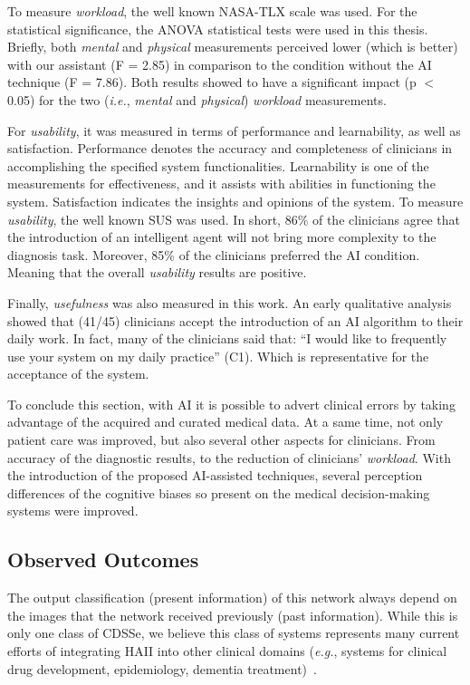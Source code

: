 To measure {\it workload}, the well known \ac{NASA-TLX} scale was used.
For the statistical significance, the \ac{ANOVA} statistical tests were used in this thesis.
Briefly, both {\it mental} and {\it physical} measurements perceived lower (which is better) with our assistant (F = 2.85) in comparison to the condition without the AI technique (F = 7.86).
Both results showed to have a significant impact (p $<$ 0.05) for the two ({\it i.e.}, {\it mental} and {\it physical}) {\it workload} measurements.

For {\it usability}, it was measured in terms of performance and learnability, as well as satisfaction.
Performance denotes the accuracy and completeness of clinicians in accomplishing the specified system functionalities.
Learnability is one of the measurements for effectiveness, and it assists with abilities in functioning the system.
Satisfaction indicates the insights and opinions of the system.
To measure {\it usability}, the well known \ac{SUS} was used.
In short, 86\% of the clinicians agree that the introduction of an intelligent agent will not bring more complexity to the diagnosis task.
Moreover, 85\% of the clinicians preferred the \ac{AI} condition.
Meaning that the overall {\it usability} results are positive.

Finally, {\it usefulness} was also measured in this work.
An early qualitative analysis showed that (41/45) clinicians accept the introduction of an \ac{AI} algorithm to their daily work.
In fact, many of the clinicians said that: ``I would like to frequently use your system on my daily practice'' (C1).
Which is representative for the acceptance of the system.

To conclude this section, with \ac{AI} it is possible to advert clinical errors by taking advantage of the acquired and curated medical data.
At a same time, not only patient care was improved, but also several other aspects for clinicians.
From accuracy of the diagnostic results, to the reduction of clinicians' {\it workload}.
With the introduction of the proposed \ac{AI}-assisted techniques, several perception differences of the cognitive biases so present on the medical decision-making systems were improved.

\subsection{Observed Outcomes}
\label{sec:app003005003}

The output classification (present information) of this network always depend on the images that the network received previously (past information).
While this is only one class of \ac{CDSSe}, we believe this class of systems represents many current efforts of integrating \ac{HAII} into other clinical domains ({\it e.g.}, systems for clinical drug development, epidemiology, dementia treatment)~\cite{Savage2019, shah2019artificial, topol2019high}.

